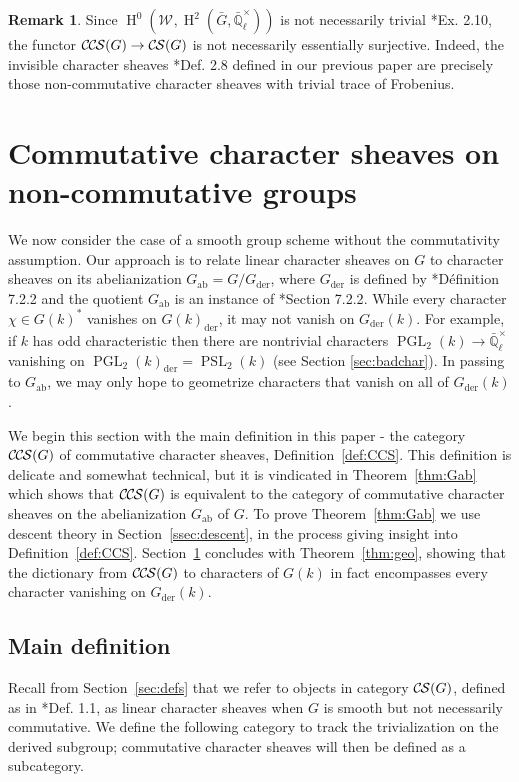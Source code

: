\documentclass[10pt]{amsart}
\theoremstyle{plain}
\theoremstyle{definition}
\newtheorem{remark}[theorem]{Remark}
\newcommand{\EE}{\mathbb{\bar Q}_\ell}
\newcommand{\EEx}{\EE^\times}
\newcommand{\Weil}[1]{\mathcal{W}_{#1}}
\DeclareMathOperator{\Hh}{H}
\DeclareMathOperator{\PGL}{PGL}
\DeclareMathOperator{\PSL}{PSL}
\newcommand{\der}{_{\operatorname{der}}}
\newcommand{\ab}{_{\operatorname{ab}}}
\newcommand{\CS}{{\mathcal{C\hskip-0.8pt S}}}
\newcommand{\CCS}{{\mathcal{C\hskip-.8pt C\hskip-0.8pt S}}}
\newcommand{\bG}{\bar{G}}
\begin{document}
\begin{remark}
Since $\Hh^0(\Weil{},\Hh^2(\bG,\EEx))$ is not necessarily trivial \cite{cunningham-roe:13a}*{Ex. 2.10}, the functor
$\CCS(G) \to \CS(G)$ is not necessarily essentially surjective.  Indeed, the invisible character sheaves \cite{cunningham-roe:13a}*{Def. 2.8}
defined in our previous paper are precisely those non-commutative character sheaves with trivial trace of Frobenius.
\end{remark}

\section{Commutative character sheaves on non-commutative groups}\label{sec:noncom}

We now consider the case of a smooth group scheme without the commutativity assumption.  Our approach
is to relate linear character sheaves on $G$ to character sheaves on its abelianization $G\ab = G / G\der$, where $G\der$ is defined by \cite{demazure:SGA3-VIB}*{D\'efinition 7.2.2} and the quotient $G\ab$ is an instance of  \cite{demazure:SGA3-VIA}*{Section 7.2.2}.
While every character $\chi \in G(k)^*$ vanishes on $G(k)\der$, it may not vanish on $G\der(k)$.  For example,
if $k$ has odd characteristic then there are nontrivial characters $\PGL_2(k) \to \EEx$ vanishing on
$\PGL_2(k)\der = \PSL_2(k)$ (see Section \ref{sec:badchar}).  In passing to $G\ab$,
we may only hope to geometrize characters that vanish on all of $G\der(k)$.

We begin this section with the main definition in this paper - the category $\CCS(G)$ of commutative character sheaves, Definition~\ref{def:CCS}. 
This definition is delicate and somewhat technical, but it is vindicated in Theorem~\ref{thm:Gab} which shows that $\CCS(G)$ is equivalent to the category of commutative character sheaves on the abelianization $G\ab$ of $G$. 
To prove Theorem~\ref{thm:Gab} we use descent theory in Section~\ref{ssec:descent}, in the process giving insight into Definition~\ref{def:CCS}. 
Section~\ref{sec:noncom} concludes with Theorem~\ref{thm:geo}, showing that the dictionary from $\CCS(G)$
to characters of $G(k)$ in fact encompasses every character vanishing on $G\der(k)$.

\subsection{Main definition}\label{ssec:noncomdef}

Recall from Section~\ref{sec:defs} that we refer to objects in category $\CS(G)$, defined as
in \cite{cunningham-roe:13a}*{Def. 1.1}, as linear character sheaves when $G$ is smooth but
not necessarily commutative.  
We define the following category to track the trivialization on the derived subgroup;
commutative character sheaves will then be defined as a subcategory.
\end{document}
